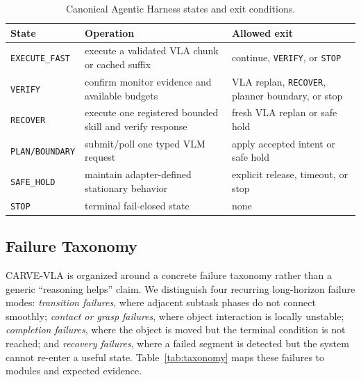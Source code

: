 \documentclass[runningheads]{waica}
\newcommand{\method}{CARVE-VLA}
\begin{document}
\begin{table}
\caption{Canonical Agentic Harness states and exit conditions.}
\label{tab:states}
\centering
\small
\begin{tabularx}{\textwidth}{p{}p{}X}
\toprule
State & Operation & Allowed exit \\
\midrule
\texttt{EXECUTE\_FAST} & execute a validated VLA chunk or cached suffix & continue, \texttt{VERIFY}, or \texttt{STOP} \\
\texttt{VERIFY} & confirm monitor evidence and available budgets & VLA replan, \texttt{RECOVER}, planner boundary, or stop \\
\texttt{RECOVER} & execute one registered bounded skill and verify response & fresh VLA replan or safe hold \\
\texttt{PLAN/BOUNDARY} & submit/poll one typed VLM request & apply accepted intent or safe hold \\
\texttt{SAFE\_HOLD} & maintain adapter-defined stationary behavior & explicit release, timeout, or stop \\
\texttt{STOP} & terminal fail-closed state & none \\
\bottomrule
\end{tabularx}
\end{table}

\subsection{Failure Taxonomy}

\method{} is organized around a concrete failure taxonomy rather than a generic ``reasoning helps'' claim.
We distinguish four recurring long-horizon failure modes:
\textit{transition failures}, where adjacent subtask phases do not connect smoothly;
\textit{contact or grasp failures}, where object interaction is locally unstable;
\textit{completion failures}, where the object is moved but the terminal condition is not reached; and
\textit{recovery failures}, where a failed segment is detected but the system cannot re-enter a useful state.
Table~\ref{tab:taxonomy} maps these failures to modules and expected evidence.
\end{document}
